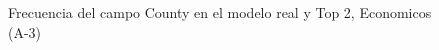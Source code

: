 \begin{figure}[H]
    \centering
    
    \caption{Frecuencia del campo County en el modelo real y Top 2, Economicos (A-3)}
    \label{frecuency-County-top2}
\end{figure}